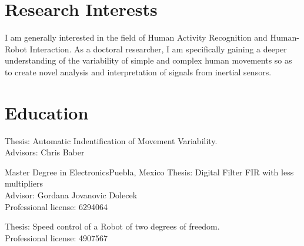 \documentclass[10pt,a4paper,roman]{moderncv}
\begin{document}
\makecvtitle

\section{Research Interests} 
I am generally interested in the field of Human Activity Recognition and Human-Robot
Interaction. As a doctoral researcher, I am specifically gaining a deeper understanding of
the variability of simple and complex human movements
so as to create novel analysis 
and interpretation of signals from inertial sensors.
    


\section{Education}

  {Thesis: Automatic Indentification of Movement Variability.
   \\ Advisors: Chris Baber  } 

  {Master Degree in Electronics}{Puebla, Mexico}{\textit{}} {Thesis:
  Digital Filter FIR with less multipliers
  \href{https://sites.google.com/site/perezxochicale/docs/MScThesis.pdf}{\faFilePdfO}
  \\ Advisor: Gordana Jovanovic Dolecek\\ Professional license: 6294064}

  {Thesis: Speed control of a Robot of two degrees of freedom.
  \href{https://sites.google.com/site/perezxochicale/docs/BachelorProject.pdf}{\faFilePdfO}
  \\ Professional license: 4907567}
\end{document}
